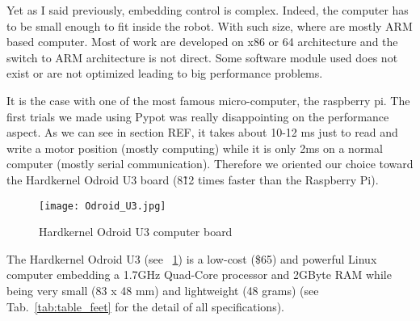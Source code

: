 Yet as I said previously, embedding control is complex. Indeed, the computer has to be small enough to fit inside the robot. With such size, where are mostly ARM based computer. Most of work are developed on x86 or 64 architecture and the switch to ARM architecture is not direct. Some software module used does not exist or are not optimized leading to big performance problems.

It is the case with one of the most famous micro-computer, the raspberry pi. The first trials we made using Pypot was really disappointing on the performance aspect. As we can see in section REF, it takes about 10-12 ms just to read and write a motor position (mostly computing) while it is only 2ms on a normal computer (mostly serial communication). Therefore we oriented our choice toward the Hardkernel Odroid U3 board (8\~12 times faster than the Raspberry Pi).

\begin{figure}[!h]
    \begin{center}
        \texttt{[image: Odroid\_U3.jpg]}
    \end{center}
    \caption{Hardkernel Odroid U3 computer board}
    \label{fig:odroid_U3}
\end{figure}

The Hardkernel Odroid U3 (see \figurename~\ref{fig:odroid_U3}) is a low-cost (\$65) and powerful Linux computer embedding a 1.7GHz Quad-Core processor and 2GByte RAM while being very small (83 x 48 mm) and lightweight (48 grams) (see Tab.~\ref{tab:table_feet} for the detail of all specifications).

